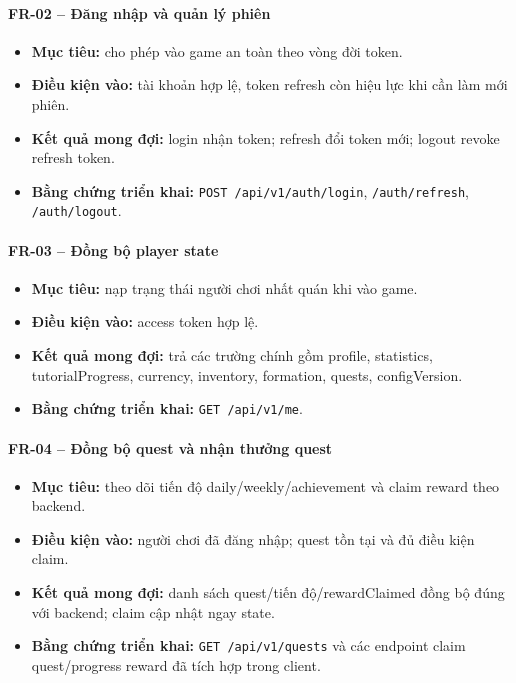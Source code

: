 \paragraph{FR-02 -- Đăng nhập và quản lý phiên}
\begin{itemize}
    \item \textbf{Mục tiêu:} cho phép vào game an toàn theo vòng đời token.
    \item \textbf{Điều kiện vào:} tài khoản hợp lệ, token refresh còn hiệu lực khi cần làm mới phiên.
    \item \textbf{Kết quả mong đợi:} login nhận token; refresh đổi token mới; logout revoke refresh token.
    \item \textbf{Bằng chứng triển khai:} \texttt{POST /api/\allowbreak v1/\allowbreak auth/\allowbreak login}, \texttt{/auth/\allowbreak refresh}, \texttt{/auth/\allowbreak logout}.
\end{itemize}

\paragraph{FR-03 -- Đồng bộ player state}
\begin{itemize}
    \item \textbf{Mục tiêu:} nạp trạng thái người chơi nhất quán khi vào game.
    \item \textbf{Điều kiện vào:} access token hợp lệ.
    \item \textbf{Kết quả mong đợi:} trả các trường chính gồm profile, statistics, tutorialProgress, currency, inventory, formation, quests, configVersion.
    \item \textbf{Bằng chứng triển khai:} \texttt{GET /api/\allowbreak v1/\allowbreak me}.
\end{itemize}

\paragraph{FR-04 -- Đồng bộ quest và nhận thưởng quest}
\begin{itemize}
    \item \textbf{Mục tiêu:} theo dõi tiến độ daily/weekly/achievement và claim reward theo backend.
    \item \textbf{Điều kiện vào:} người chơi đã đăng nhập; quest tồn tại và đủ điều kiện claim.
    \item \textbf{Kết quả mong đợi:} danh sách quest/tiến độ/rewardClaimed đồng bộ đúng với backend; claim cập nhật ngay state.
    \item \textbf{Bằng chứng triển khai:} \texttt{GET /api/\allowbreak v1/\allowbreak quests} và các endpoint claim quest/\allowbreak progress reward đã tích hợp trong client.
\end{itemize}

